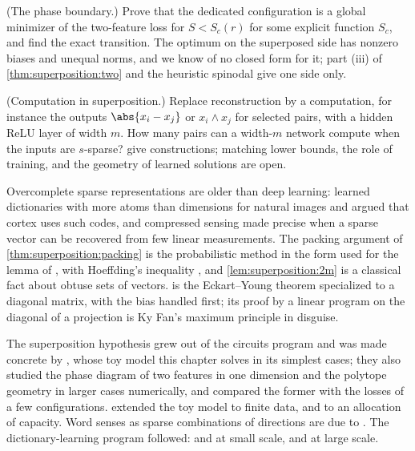 \begin{refsection}
\begin{exercises}
\item \research (The phase boundary.) Prove that the dedicated configuration is a global minimizer of the two-feature loss for $S<S_c(r)$ for some explicit function $S_c$, and find the exact transition. The optimum on the superposed side has nonzero biases and unequal norms, and we know of no closed form for it; part (iii) of \cref{thm:superposition:two} and the heuristic spinodal give one side only. \label{ex:superposition:boundary}

\item \research (Computation in superposition.) Replace reconstruction by a computation, for instance the outputs $\abs{x_i-x_j}$ or $x_i\wedge x_j$ for selected pairs, with a hidden ReLU layer of width $m$. How many pairs can a width-$m$ network compute when the inputs are $s$-sparse? \Textcite{HanniEtAl2024} give constructions; matching lower bounds, the role of training, and the geometry of learned solutions are open. \label{ex:superposition:computation}
\end{exercises}

\notesandrefs
Overcomplete sparse representations are older than deep learning: \textcite{OlshausenField1997} learned dictionaries with more atoms than dimensions for natural images and argued that cortex uses such codes, and compressed sensing \parencite{CandesEtAl2006,Donoho2006} made precise when a sparse vector can be recovered from few linear measurements. The packing argument of \cref{thm:superposition:packing} is the probabilistic method in the form used for the lemma of \textcite{JohnsonLindenstrauss1984}, with Hoeffding's inequality \parencite{Hoeffding1963}, and \cref{lem:superposition:2m} is a classical fact about obtuse sets of vectors.  is the Eckart--Young theorem \parencite{EckartYoung1936} specialized to a diagonal matrix, with the bias handled first; its proof by a linear program on the diagonal of a projection is Ky Fan's maximum principle in disguise.

The superposition hypothesis grew out of the circuits program \parencite{OlahEtAl2020} and was made concrete by \textcite{ElhageEtAl2022}, whose toy model this chapter solves in its simplest cases; they also studied the phase diagram of two features in one dimension and the polytope geometry in larger cases numerically, and compared the former with the losses of a few configurations. \Textcite{HenighanEtAl2023} extended the toy model to finite data, and \textcite{ScherlisEtAl2022} to an allocation of capacity. Word senses as sparse combinations of directions are due to \textcite{AroraEtAl2018}. The dictionary-learning program followed: \textcite{CunninghamEtAl2024} and \textcite{BrickenEtAl2023} at small scale, \textcite{TempletonEtAl2024} and \textcite{GaoEtAl2025} at large scale.


\end{refsection}
